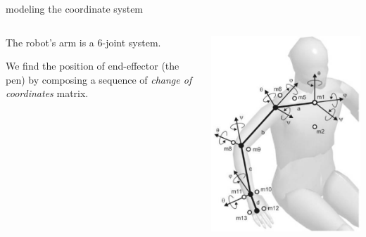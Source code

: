 \documentclass{beamer}
\begin{document}
\begin{frame}[allowframebreaks]{modeling the coordinate system}

	\begin{columns}
		\begin{column}{0.5\textwidth}
			\justify
			The robot's arm is a 6-joint system.

			We find the position of end-effector (the pen) by composing a sequence of \emph{change of coordinates} matrix.
		\end{column}
		\begin{column}{0.5\textwidth}  %
			\begin{center}
				\includegraphics[scale = 0.35]{arm.jpg}\cite{3}
			\end{center}
		\end{column}
	\end{columns}





\end{frame}
\end{document}
